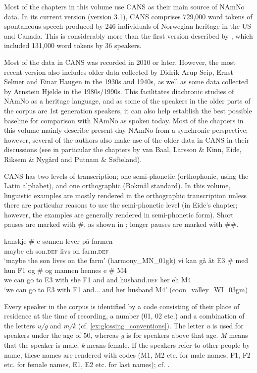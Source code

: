 \documentclass[output=paper,colorlinks,citecolor=brown]{langscibook}
\begin{document}
Most of the chapters in this volume use CANS as their main source of NAmNo data. In its current version (version 3.1), CANS comprises 729,000 word tokens of spontaneous speech produced by 246 individuals of Norwegian heritage in the US and Canada. This is considerably more than the first version described by \citet{johannessen2015cans}, which included 131,000 word tokens by 36 speakers.

Most of the data in CANS was recorded in 2010 or later. However, the most recent version  also includes older data collected by Didrik Arup Seip, Ernst Selmer and Einar Haugen in the 1930s and 1940s, as well as some data collected by Arnstein Hjelde in the 1980s/1990s. This facilitates diachronic studies of NAmNo as a heritage language, and as some of the speakers in the older parts of the corpus are 1st generation speakers, it can also help establish the best possible baseline for comparison with NAmNo as spoken today. Most of the chapters in this volume mainly describe present-day NAmNo from a synchronic perspective; however, several of the  authors also make use of the older data in CANS in their discussions (see in particular the chapters by van Baal, Larsson \& Kinn, Eide, Riksem \& Nygård and Putnam \& Søfteland). 

CANS has two levels of transcription; one semi-phonetic (orthophonic,  using the Latin alphabet), and one orthographic (Bokmål standard). In this volume, linguistic examples are mostly rendered in the orthographic transcription unless there are particular reasons to use the semi-phonetic level (in Eide's chapter; however, the examples are generally rendered in semi-phonetic form). Short pauses are marked with \#, as shown in ; longer pauses are marked with \#\#. 

\ea\label{ex:glossing_conventions}
\ea
\gll kanskje \# e sønnen lever på farmen\\
 maybe {} eh son.\textsc{def} livs on farm.\textsc{def} \\
\glt `maybe the son lives on the farm' (harmony\_MN\_01gk)
\ex \label{ex:glossing_names}
\gll vi kan gå åt E3 \# med hun	F1	og \# og mannen hennes e \# M4 \\
we can go to E3 {} with she F1 and {} and husband.\textsc{def} her eh {} M4 \\
\glt `we can go to E3 with F1 and... and her husband M4' (coon\_valley\_WI\_03gm)
\z
\z

Every speaker in the corpus is identified by a code consisting of their place of residence at the time of recording, a number (01, 02 etc.) and a combination of the letters \emph{u/g} and \emph{m/k} (cf. \ref{ex:glossing_conventions}). The letter \emph{u} is used for speakers under the age of 50, whereas \emph{g} is for speakers above that age. \emph{M} means that the speaker is male; \emph{k} means female. If the speakers refer to other people by name, these names are rendered with codes (M1, M2 etc. for male names, F1, F2 etc. for female names, E1, E2 etc. for last names); cf. . 
\end{document}
